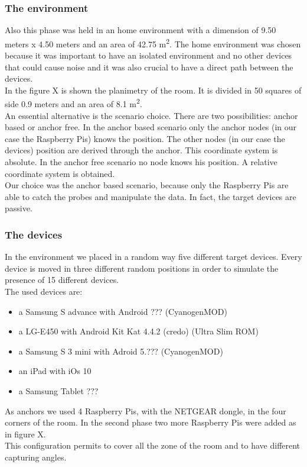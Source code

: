 \subsubsection{The environment}
Also this phase was held in an home environment with a dimension of 9.50 meters x 4.50 meters and an area of 42.75 m\textsuperscript{2}.
The home environment was chosen because it was important to have an isolated environment and no other devices that could cause noise and it was also crucial to have a direct path between the devices.\\
In the figure X is shown the planimetry of the room. It is divided in 50 squares of side 0.9 meters and an area of 8.1 m\textsuperscript{2}.\\
\linebreak
An essential alternative is the scenario choice. There are two possibilities: anchor based or anchor free. In the anchor based scenario only the anchor nodes (in our case the Raspberry Pis) knows the position. The other nodes (in our case the devices) position are derived through the anchor. This coordinate system is absolute. In the anchor free scenario no node knows his position. A relative coordinate system is obtained.\\
Our choice was the anchor based scenario, because only the Raspberry Pis are able to catch the probes and manipulate the data. In fact, the target devices are passive.
\subsubsection{The devices}
In the environment we placed in a random way five different target devices. Every device is moved in three different random positions in order to simulate the presence of 15 different devices.\\
The used devices are:
\begin{itemize}
\item a Samsung S advance with Android ??? (CyanogenMOD)
\item a LG-E450 with Android Kit Kat 4.4.2 (credo) (Ultra Slim ROM)
\item a Samsung S 3 mini with Adroid 5.??? (CyanogenMOD)
\item an iPad with iOs 10
\item a Samsung Tablet ???
\end{itemize}
As anchors we used 4 Raspberry Pis, with the NETGEAR dongle, in the four corners of the room. In the second phase two more Raspberry Pis were added as in figure X. \\
This configuration permits to cover all the zone of the room and to have different capturing angles.

